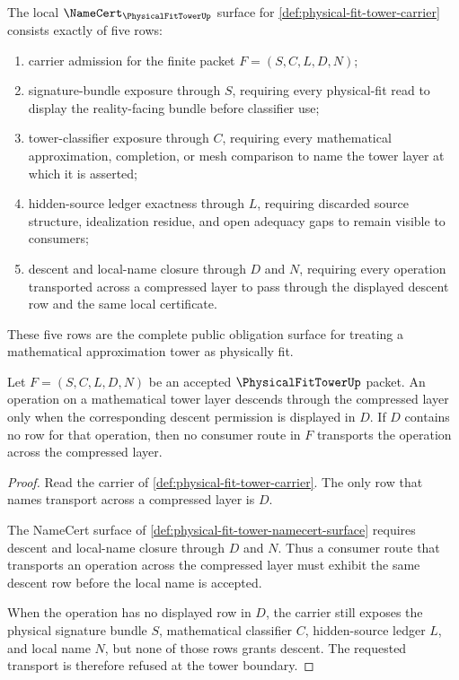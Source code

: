 \begin{definition}
\label{def:physical-fit-tower-namecert-surface}
The local $\NameCert_{\PhysicalFitTowerUp}$ surface for \autoref{def:physical-fit-tower-carrier} consists exactly of five rows:
\begin{enumerate}
\item carrier admission for the finite packet $F=(S,C,L,D,N)$;
\item signature-bundle exposure through $S$, requiring every physical-fit read to display the reality-facing bundle before classifier use;
\item tower-classifier exposure through $C$, requiring every mathematical approximation, completion, or mesh comparison to name the tower layer at which it is asserted;
\item hidden-source ledger exactness through $L$, requiring discarded source structure, idealization residue, and open adequacy gaps to remain visible to consumers;
\item descent and local-name closure through $D$ and $N$, requiring every operation transported across a compressed layer to pass through the displayed descent row and the same local certificate.
\end{enumerate}
These five rows are the complete public obligation surface for treating a mathematical approximation tower as physically fit.
\end{definition}

\begin{theorem}
\label{thm:physical-fit-tower-no-free-descent}
Let $F=(S,C,L,D,N)$ be an accepted $\PhysicalFitTowerUp$ packet. An operation on a mathematical tower layer descends through the compressed layer only when the corresponding descent permission is displayed in $D$. If $D$ contains no row for that operation, then no consumer route in $F$ transports the operation across the compressed layer.
\end{theorem}
\begin{proof}
Read the carrier of \autoref{def:physical-fit-tower-carrier}. The only row that names transport across a compressed layer is $D$.

The NameCert surface of \autoref{def:physical-fit-tower-namecert-surface} requires descent and local-name closure through $D$ and $N$. Thus a consumer route that transports an operation across the compressed layer must exhibit the same descent row before the local name is accepted.

When the operation has no displayed row in $D$, the carrier still exposes the physical signature bundle $S$, mathematical classifier $C$, hidden-source ledger $L$, and local name $N$, but none of those rows grants descent. The requested transport is therefore refused at the tower boundary.
\end{proof}

